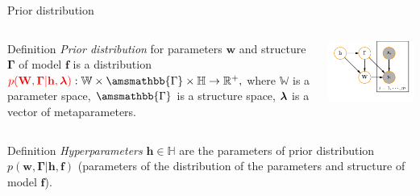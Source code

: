 \documentclass[usenames,dvipsnames,11pt,pdf,utf8,russian,aspectratio=169]{beamer}
\begin{document}
\begin{frame}{Prior distribution}
\footnotesize   
\begin{columns}
\begin{column}{0.7\textwidth}
   \begin{block}{Definition}
\textit{Prior distribution} for parameters $\mathbf{w}$ and structure $\boldsymbol{\Gamma}$ of model $\mathbf{f}$ is a distribution
$
    \textcolor{red}{p(\mathbf{W}, \boldsymbol{\Gamma}|\mathbf{h},\lam)}: \mathbb{W} \times \amsmathbb{\Gamma} \times \mathbb{H} \to \mathbb{R}^{+}, 
$
where $\mathbb{W}$ is a parameter space, $\amsmathbb{\Gamma}$ is a structure space, $\boldsymbol{\lambda}$ is a vector of metaparameters.
\end{block}

\end{column}
\begin{column}{0.25\textwidth}  %
    \begin{center}
     \includegraphics[width=\textwidth]{simple_plate.pdf}
     \end{center}
\end{column}
\end{columns}
\vspace*{-0.5cm}
\begin{block}{Definition}
\textit{Hyperparameters} $\mathbf{h}\in \mathbb{H}$ are the parameters of prior distribution $p(\mathbf{w}, \boldsymbol{\Gamma}|\mathbf{h},\mathbf{f})$ (parameters of the distribution of the parameters and structure  of model $\mathbf{f}$).
 

\end{block}
\end{frame}
\end{document}
